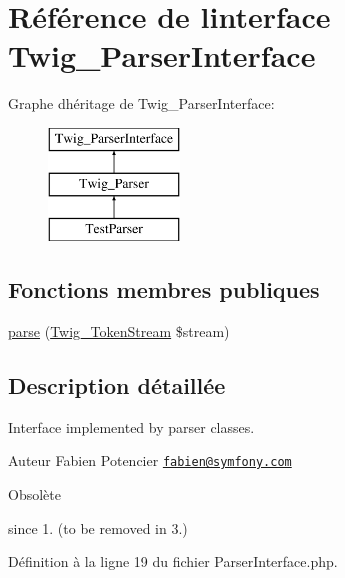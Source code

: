 \hypertarget{interface_twig___parser_interface}{}\section{Référence de l\textquotesingle{}interface Twig\+\_\+\+Parser\+Interface}
\label{interface_twig___parser_interface}
Graphe d\textquotesingle{}héritage de Twig\+\_\+\+Parser\+Interface\+:\begin{figure}[H]
\begin{center}
\leavevmode
\includegraphics[height=3.000000cm]{interface_twig___parser_interface}
\end{center}
\end{figure}
\subsection*{Fonctions membres publiques}
\begin{DoxyCompactItemize}
\item 
\hyperlink{interface_twig___parser_interface_a1de4218ce9c025eaa18ce55616c98fe7}{parse} (\hyperlink{class_twig___token_stream}{Twig\+\_\+\+Token\+Stream} \$stream)
\end{DoxyCompactItemize}


\subsection{Description détaillée}
Interface implemented by parser classes.

\begin{DoxyAuthor}{Auteur}
Fabien Potencier \href{mailto:fabien@symfony.com}{\tt fabien@symfony.\+com}
\end{DoxyAuthor}
\begin{DoxyRefDesc}{Obsolète}
\item[\hyperlink{deprecated__deprecated000034}{Obsolète}]since 1. (to be removed in 3.) \end{DoxyRefDesc}


Définition à la ligne 19 du fichier Parser\+Interface.\+php.



